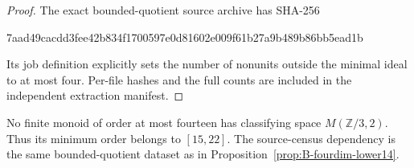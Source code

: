 \begin{proof}
The exact bounded-quotient source archive has SHA-256
\begin{center}\scriptsize\ttfamily
7aad49cacdd3fee42b834f1700597e0d81602e009f61b27a9b489b86bb5ead1b
\end{center}
Its job definition explicitly sets the number of nonunits outside
the minimal ideal to at most four.  Per-file hashes and the full
counts are included in the independent extraction manifest.
\end{proof}









\begin{proposition}
\label{prop:B-Moore3-lower14}
No finite monoid of order at most fourteen has classifying space
$M(\mathbb Z/3,2)$.  Thus its minimum order belongs to $[15,22]$.
The source-census dependency is the same bounded-quotient dataset
as in Proposition~\ref{prop:B-fourdim-lower14}.
\end{proposition}
